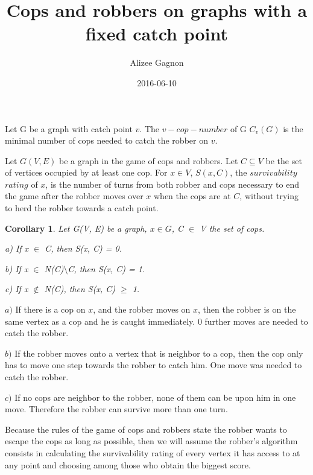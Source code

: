 \documentclass{article}
\title{Cops and robbers on graphs with a fixed catch point}
\date{2016-06-10}
\author{Alizee Gagnon}
\newtheorem{corollary}[theorem]{Corollary}
\newenvironment{proof}[1][Proof]{\begin{trivlist}
\item[\hskip \labelsep {\bfseries #1}]}{\end{trivlist}}
\newenvironment{definition}[1][Definition]{\begin{trivlist}
\item[\hskip \labelsep {\bfseries #1}]}{\end{trivlist}}
\begin{document}
\maketitle
\begin{definition}
Let G be a graph with catch point $v$. The $v-cop-number$ of G $C_{v}(G)$ is the minimal number of cops needed to catch the robber on $v$.
\end{definition}
\begin{definition}
\label{survivability_def}
Let $G(V, E)$ be a graph in the game of cops and robbers. Let $C \subseteq V$ be the set of vertices occupied by at least one cop. For $x\in V$, $S(x, C)$, the $survivability$ $rating$ of $x$, is the number of turns from both robber and cops necessary to end the game after the robber moves over $x$ when the cops are at $C$, without trying to herd the robber towards a catch point.
\end{definition}
\begin{corollary}
\label{survivability_lem}
Let G(V, E) be a graph, $x \in G$, C $\in$ V the set of cops.

a) If x $\in$ C, then S(x, C) = 0.

b) If x $\in$ N(C)$\setminus$C, then S(x, C) = 1.

c) If x $\notin$ N(C), then S(x, C) $\ge$ 1.


\end{corollary}
\begin{proof}


$a)$ If there is a cop on $x$, and the robber moves on $x$, then the robber is on the same vertex as a cop and he is caught immediately. 0 further moves are needed to catch the robber.

$b)$ If the robber moves onto a vertex that is neighbor to a cop, then the cop only has to move one step towards the robber to catch him. One move was needed to catch the robber.

$c)$ If no cops are neighbor to the robber, none of them can be upon him in one move. Therefore the robber can survive more than one turn.
\end{proof}

Because the rules of the game of cops and robbers state the robber wants to escape the cops as long as possible, then we will assume the robber's algorithm consists in calculating the survivability rating of every vertex it has access to at any point and choosing among those who obtain the biggest score.
\end{document}
